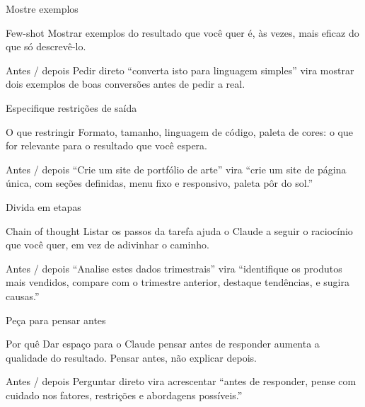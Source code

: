 \documentclass[aspectratio=169,11pt]{beamer}
\begin{document}
\begin{frame}{Mostre exemplos}
  \begin{notebox}{Few-shot}
    \small Mostrar exemplos do resultado que você quer é, às vezes, mais eficaz do que só descrevê-lo.
  \end{notebox}
  \vspace{0.3cm}
  \begin{alertbox}{Antes / depois}
    \small Pedir direto ``converta isto para linguagem simples'' vira mostrar dois exemplos de boas conversões antes de pedir a real.
  \end{alertbox}
\end{frame}

\begin{frame}{Especifique restrições de saída}
  \begin{notebox}{O que restringir}
    \small Formato, tamanho, linguagem de código, paleta de cores: o que for relevante para o resultado que você espera.
  \end{notebox}
  \vspace{0.3cm}
  \begin{alertbox}{Antes / depois}
    \small ``Crie um site de portfólio de arte'' vira ``crie um site de página única, com seções definidas, menu fixo e responsivo, paleta pôr do sol.''
  \end{alertbox}
\end{frame}

\begin{frame}{Divida em etapas}
  \begin{notebox}{Chain of thought}
    \small Listar os passos da tarefa ajuda o Claude a seguir o raciocínio que você quer, em vez de adivinhar o caminho.
  \end{notebox}
  \vspace{0.3cm}
  \begin{alertbox}{Antes / depois}
    \small ``Analise estes dados trimestrais'' vira ``identifique os produtos mais vendidos, compare com o trimestre anterior, destaque tendências, e sugira causas.''
  \end{alertbox}
\end{frame}

\begin{frame}{Peça para pensar antes}
  \begin{notebox}{Por quê}
    \small Dar espaço para o Claude pensar antes de responder aumenta a qualidade do resultado. Pensar antes, não explicar depois.
  \end{notebox}
  \vspace{0.3cm}
  \begin{alertbox}{Antes / depois}
    \small Perguntar direto vira acrescentar ``antes de responder, pense com cuidado nos fatores, restrições e abordagens possíveis.''
  \end{alertbox}
\end{frame}
\end{document}
